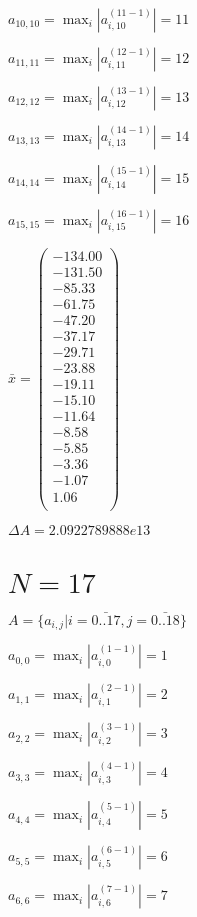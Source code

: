 \documentclass[a4paper,12pt]{article}
\begin{document}
$a _{ 10, 10 } =  \max _i |a _{ i, 10 } ^{ (11 - 1) } | = 11$

$a _{ 11, 11 } =  \max _i |a _{ i, 11 } ^{ (12 - 1) } | = 12$

$a _{ 12, 12 } =  \max _i |a _{ i, 12 } ^{ (13 - 1) } | = 13$

$a _{ 13, 13 } =  \max _i |a _{ i, 13 } ^{ (14 - 1) } | = 14$

$a _{ 14, 14 } =  \max _i |a _{ i, 14 } ^{ (15 - 1) } | = 15$

$a _{ 15, 15 } =  \max _i |a _{ i, 15 } ^{ (16 - 1) } | = 16$

$\bar { x } = \begin{pmatrix}
-134.00 \\
-131.50 \\
-85.33 \\
-61.75 \\
-47.20 \\
-37.17 \\
-29.71 \\
-23.88 \\
-19.11 \\
-15.10 \\
-11.64 \\
-8.58 \\
-5.85 \\
-3.36 \\
-1.07 \\
1.06 \\
\end{pmatrix}
$

$\Delta A = 2.0922789888e13$



\section{ $N = 17$ }
$A = \{ a _{ i, j } | i = \bar { 0..17 }, j = \bar { 0..18 } \}$

$a _{ 0, 0 } =  \max _i |a _{ i, 0 } ^{ (1 - 1) } | = 1$

$a _{ 1, 1 } =  \max _i |a _{ i, 1 } ^{ (2 - 1) } | = 2$

$a _{ 2, 2 } =  \max _i |a _{ i, 2 } ^{ (3 - 1) } | = 3$

$a _{ 3, 3 } =  \max _i |a _{ i, 3 } ^{ (4 - 1) } | = 4$

$a _{ 4, 4 } =  \max _i |a _{ i, 4 } ^{ (5 - 1) } | = 5$

$a _{ 5, 5 } =  \max _i |a _{ i, 5 } ^{ (6 - 1) } | = 6$

$a _{ 6, 6 } =  \max _i |a _{ i, 6 } ^{ (7 - 1) } | = 7$
\end{document}
